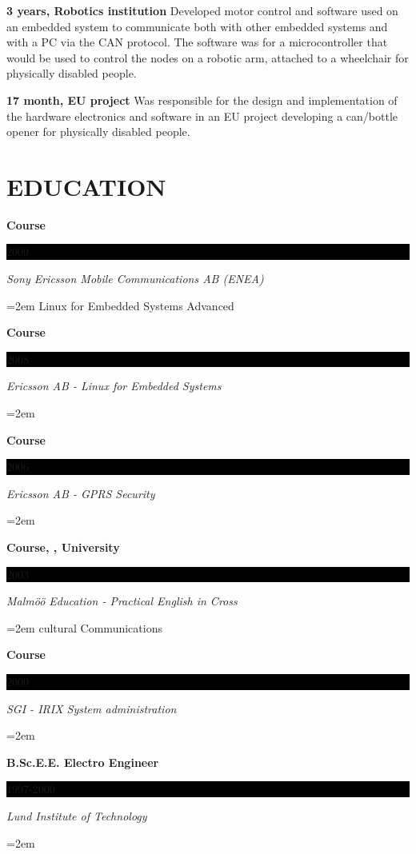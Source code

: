\documentclass[a4paper,12pt,final]{memoir}
\newcommand{\CVItem}[1]
	{\textbf{\color{RoyalBlue} #1}}
\newcommand{\sepspace}{\vspace*{1em}}
\newcommand{\NewPart}[1]{\section*{\uppercase{#1}}}
\newcommand{\EducationEntry}[4]{
  \noindent \textbf{#1} \hfill 					%
  \colorbox{Black} {%
    \parbox{6em}{%
      \hfill\color{White}#2
    }
  } \par		%
  \noindent \textit{#3} \par					%
  \noindent\hangindent=2em\hangafter=0 \small #4 	%
  \normalsize \par
}
\begin{document}
\CVItem{3 years, Robotics institution}		
{Developed motor control and software used on an embedded system to communicate both with other  embedded systems and with a PC via the CAN protocol.
  The software was for a microcontroller that would be used to control the nodes on a robotic arm, attached to a wheelchair for physically disabled people.
} 
\sepspace

\CVItem{17 month, EU project}		
{Was responsible for the design and implementation of the hardware electronics and software in an EU project developing a can/bottle opener for physically disabled people. 
} 


\NewPart{Education}{}

\EducationEntry {Course}{2009}{Sony Ericsson Mobile Communications AB (ENEA)}
{Linux for Embedded Systems Advanced}	
\sepspace

\EducationEntry {Course}{2008}{Ericsson AB - Linux for Embedded Systems}{}

\EducationEntry {Course}{2006}{Ericsson AB - GPRS Security}{}

\EducationEntry{Course, , University}{2003}{Malm\"{o}ö Education - Practical English in Cross}{cultural Communications}
\sepspace

\EducationEntry {Course}{2000}{SGI - IRIX System administration}{}

\EducationEntry{B.Sc.E.E. Electro Engineer}{1997-2000}{Lund Institute of Technology}{}
\end{document}
